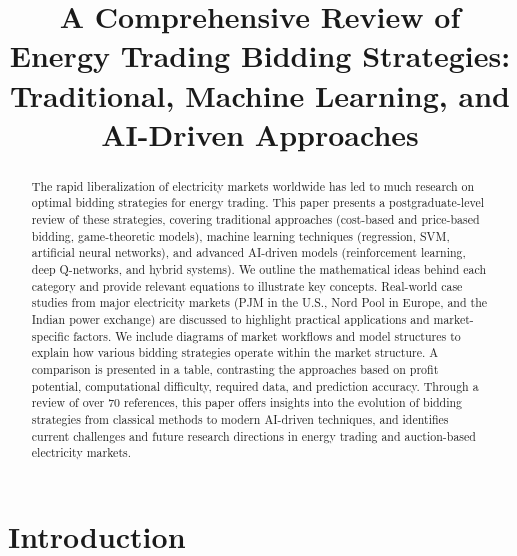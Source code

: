 \documentclass[conference]{IEEEtran}
\begin{document}
\title{A Comprehensive Review of Energy Trading Bidding Strategies: \\
Traditional, Machine Learning, and AI-Driven Approaches}

\author{
}

\maketitle %

\begin{abstract}
The rapid liberalization of electricity markets worldwide has led to much research on optimal bidding strategies for energy trading. This paper presents a postgraduate-level review of these strategies, covering traditional approaches (cost-based and price-based bidding, game-theoretic models), machine learning techniques (regression, SVM, artificial neural networks), and advanced AI-driven models (reinforcement learning, deep Q-networks, and hybrid systems). We outline the mathematical ideas behind each category and provide relevant equations to illustrate key concepts. Real-world case studies from major electricity markets (PJM in the U.S., Nord Pool in Europe, and the Indian power exchange) are discussed to highlight practical applications and market-specific factors. We include diagrams of market workflows and model structures to explain how various bidding strategies operate within the market structure. A comparison is presented in a table, contrasting the approaches based on profit potential, computational difficulty, required data, and prediction accuracy. Through a review of over 70 references, this paper offers insights into the evolution of bidding strategies from classical methods to modern AI-driven techniques, and identifies current challenges and future research directions in energy trading and auction-based electricity markets.
\end{abstract}


\section{Introduction}
\end{document}
